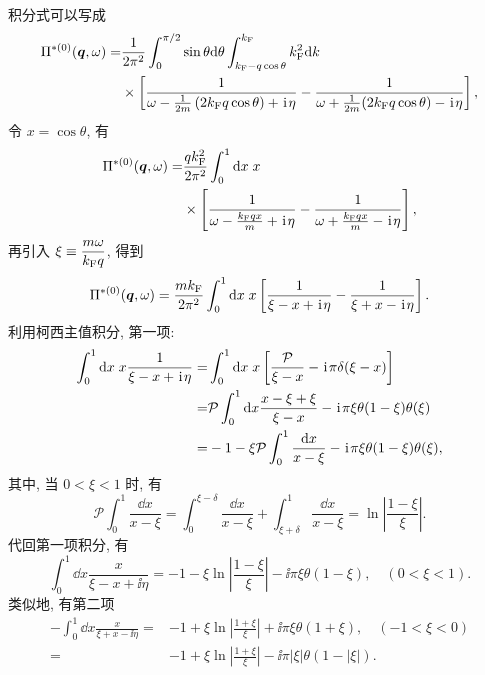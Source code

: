 积分式可以写成 
 \begin{align}
        \Pi^{*(0)}(\boldsymbol{q},\omega)=&\frac{1}{2\pi^2}\int_0^{\pi/2}\sin\theta\mathrm{d}\theta \int_{k_{\mathrm{F}}-q\cos\theta}^{k_{\mathrm{F}}}k_{\mathrm{F}}^2\mathrm{d} k\nonumber\\
        &\times \left[ \frac{1}{\omega-\frac{1}{2m}\left( 2k_{\mathrm{F}}q\cos\theta \right)+\hspace{0.1em}\mathrm{i}\hspace{0.1em}\eta} -\frac{1}{\omega+\frac{1}{2m}(2k_{\mathrm{F}}q\cos\theta)-\hspace{0.1em}\mathrm{i}\hspace{0.1em}\eta}\right],
    \end{align}
令 $x=\cos\theta$, 有 
 \begin{align}
        \Pi^{*(0)}(\boldsymbol{q},\omega)=&\frac{q k_{\mathrm{F}}^2}{2\pi^2}\int_0^1\mathrm{d} x\; x\nonumber\\
        &\times\left[ \frac{1}{\omega-\frac{k_{\mathrm{F}}qx}{m}+\hspace{0.1em}\mathrm{i}\hspace{0.1em}\eta}-\frac{1}{\omega+\frac{k_{\mathrm{F}}qx}{m}-\hspace{0.1em}\mathrm{i}\hspace{0.1em}\eta} \right],
    \end{align}
再引入 $\displaystyle\xi\equiv \frac{m\omega}{k_{\mathrm{F}}q}$, 得到 
\begin{equation}
    \Pi^{*(0)}(\boldsymbol{q},\omega)=\frac{mk_{\mathrm{F}}}{2\pi^2}\int_0^1 \mathrm{d} x\; x\left[ \frac{1}{\xi-x+\hspace{0.1em}\mathrm{i}\hspace{0.1em}\eta}-\frac{1}{\xi+x-\hspace{0.1em}\mathrm{i}\hspace{0.1em}\eta} \right].
\end{equation}
利用柯西主值积分, 第一项: 
  \begin{align}
        \int_0^1\mathrm{d} x\; x\frac{1}{\xi-x+\hspace{0.1em}\mathrm{i}\hspace{0.1em}\eta}=&\int_0^1\mathrm{d} x\; x\left[ \frac{\mathcal{P}}{\xi-x}-\hspace{0.1em}\mathrm{i}\hspace{0.1em}\pi\delta(\xi-x) \right]\nonumber\\
        =&\mathcal{P}\int_0^1\mathrm{d} x\frac{x-\xi+\xi}{\xi-x}-\hspace{0.1em}\mathrm{i}\hspace{0.1em}\pi\xi\theta(1-\xi)\theta(\xi)\nonumber\\
        =&-1-\xi\mathcal{P}\int_0^1\frac{\mathrm{d} x}{x-\xi}-\hspace{0.1em}\mathrm{i}\hspace{0.1em}\pi\xi\theta(1-\xi)\theta(\xi),
    \end{align}
其中, 当 $0<\xi<1$ 时, 有 
\begin{equation}
    \mathcal{P}\int_0^1\frac{\dd x}{x-\xi}=\int_0^{\xi-\delta}\frac{\dd x}{x-\xi}+\int_{\xi+\delta}^1\frac{\dd x}{x-\xi}=\ln \left| \frac{1-\xi}{\xi} \right|.
\end{equation}
代回第一项积分, 有 
\begin{equation}
    \int_0^1\dd x\frac{x}{\xi-x+\ii\eta}=-1-\xi\ln\left| \frac{1-\xi}{\xi} \right|-\ii\pi\xi\theta(1-\xi),\quad (0<\xi<1).
\end{equation}
类似地, 有第二项
 \begin{align}
        -\int_0^1\dd x\frac{x}{\xi+x-\ii\eta}=&-1+\xi\ln\left| \frac{1+\xi}{\xi} \right|+\ii\pi\xi\theta(1+\xi),\quad (-1<\xi<0)\nonumber\\
        =&-1+\xi\ln\left| \frac{1+\xi}{\xi} \right|-\ii\pi|\xi|\theta(1-|\xi|).
    \end{align}
